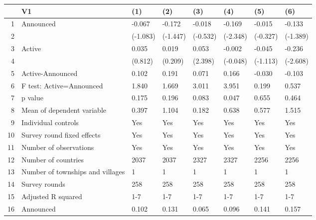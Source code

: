 \begin{table}[ht]
\centering
\begin{tabular}{rlllllll}
  \hline
 & V1 & (1) & (2) & (3) & (4) & (5) & (6) \\ 
  \hline
1 & Announced & -0.067 & -0.172 & -0.018 & -0.169 & -0.015 & -0.133 \\ 
  2 &  & (-1.083) & (-1.447) & (-0.532) & (-2.348) & (-0.327) & (-1.389) \\ 
  3 & Active & 0.035 & 0.019 & 0.053 & -0.002 & -0.045 & -0.236 \\ 
  4 &  & (0.812) & (0.209) & (2.398) & (-0.048) & (-1.113) & (-2.608) \\ 
  5 & Active-Announced & 0.102 & 0.191 & 0.071 & 0.166 & -0.030 & -0.103 \\ 
  6 & F test: Active=Announced & 1.840 & 1.669 & 3.011 & 3.951 & 0.199 & 0.537 \\ 
  7 & p value & 0.175 & 0.196 & 0.083 & 0.047 & 0.655 & 0.464 \\ 
  8 & Mean of dependent variable & 0.397 & 1.104 & 0.182 & 0.638 & 0.577 & 1.515 \\ 
  9 & Individual controls & Yes & Yes & Yes & Yes & Yes & Yes \\ 
  10 & Survey round fixed effects & Yes & Yes & Yes & Yes & Yes & Yes \\ 
  11 & Number of observations & Yes & Yes & Yes & Yes & Yes & Yes \\ 
  12 & Number of countries & 2037 & 2037 & 2327 & 2327 & 2256 & 2256 \\ 
  13 & Number of townships and villages & 1 & 1 & 1 & 1 & 1 & 1 \\ 
  14 & Survey rounds & 258 & 258 & 258 & 258 & 258 & 258 \\ 
  15 & Adjusted R squared & 1-7 & 1-7 & 1-7 & 1-7 & 1-7 & 1-7 \\ 
  16 & Announced & 0.102 & 0.131 & 0.065 & 0.096 & 0.141 & 0.157 \\ 
   \hline
\end{tabular}
\end{table}
